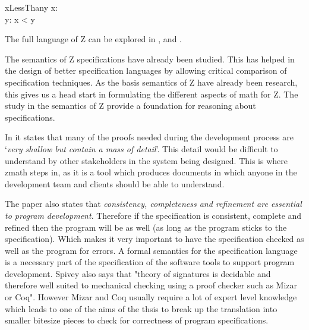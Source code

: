 \begin{schema}{xLessThany}
x: \nat \\
y: \nat
\where
x < y
\end{schema}

The full language of Z can be explored in \cite{spiveyreferencemanual}, \cite{essenceofz} and \cite{Woodcock:1996:UZS:235337}.

The semantics of Z specifications have already been studied. This has helped in the design of better specification languages by allowing critical comparison of specification techniques. As the basis semantics of Z have already been research, this gives us a head start in formulating the different aspects of \gls{math} for Z. The study in the semantics of Z provide a foundation for reasoning about specifications.

In \cite{formsem} it states that many of the proofs needed during the development process are `\textit{very shallow but contain a mass of detail}'. This detail would be difficult to understand by other stakeholders in the system being designed. This is where \gls{zmath} steps in, as it is a tool which produces documents in which anyone in the development team and clients should be able to understand.

The paper also states that \textit{consistency, completeness and refinement are essential to program development}. Therefore if the specification is consistent, complete and refined then the program will be as well (as long as the program sticks to the specification). Which makes it very important to have the specification checked as well as the program for errors. A formal semantics for the specification language is a necessary part of the specification of the software tools to support program development. Spivey also says that "theory  of signatures is decidable and therefore well suited to mechanical checking using a proof checker such as Mizar or Coq". However Mizar and Coq usually require a lot of expert level knowledge which leads to one of the aims of the thsis to break up the translation into smaller bitesize pieces to check for correctness of program specifications.

